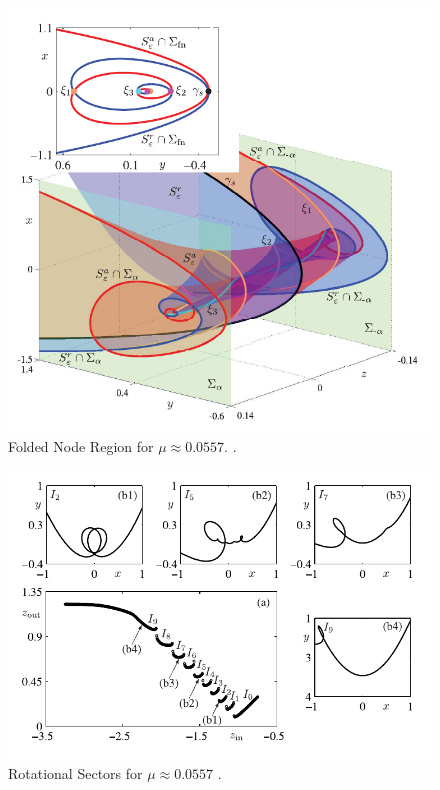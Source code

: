 \begin{figure}[h!]\centering
	\includegraphics{Images/MMO-spirals}
	\caption{Folded Node Region for $\mu \approx0.0557$. \citep{MMO}.}
	\label{fig: MMo1pic}
\end{figure}

\begin{figure}[h!]\centering
	\includegraphics{Images/MMO2}
	\caption{Rotational Sectors for $\mu \approx 0.0557$ \citep{MMO}.}
	\label{fig: MMo2pic}
\end{figure}


